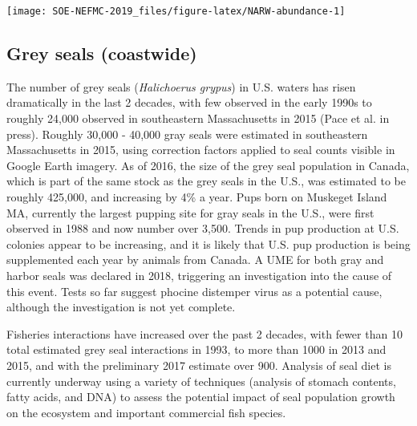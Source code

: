 \documentclass[10pt,]{article}
\let\origfigure\figure
\let\endorigfigure\endfigure
\renewenvironment{figure}[1][2] {
    \expandafter\origfigure\expandafter[H]
} {
    \endorigfigure
}
\begin{document}
\begin{figure}

{\centering \texttt{[image: SOE-NEFMC-2019\_files/figure-latex/NARW-abundance-1]} 

}

\caption{Right whale abundance estimates with 95\% credible intervals. These values represent the estimated number of animals alive sometime during the year referenced and NOT at the end of the year referenced. Seventeen known deaths were recorded in 2017 (likely all from anthropogenic causes), but these deaths were not reflected in the 2017 estimate because those animals were alive sometime during the year.}\label{fig:NARW-abundance}
\end{figure}

\subsection{Grey seals (coastwide)}\label{grey-seals-coastwide}

The number of grey seals (\emph{Halichoerus grypus}) in U.S. waters has
risen dramatically in the last 2 decades, with few observed in the early
1990s to roughly 24,000 observed in southeastern Massachusetts in 2015
(Pace et al. in press). Roughly 30,000 - 40,000 gray seals were
estimated in southeastern Massachusetts in 2015, using correction
factors applied to seal counts visible in Google Earth imagery. As of
2016, the size of the grey seal population in Canada, which is part of
the same stock as the grey seals in the U.S., was estimated to be
roughly 425,000, and increasing by 4\% a year. Pups born on Muskeget
Island MA, currently the largest pupping site for gray seals in the
U.S., were first observed in 1988 and now number over 3,500. Trends in
pup production at U.S. colonies appear to be increasing, and it is
likely that U.S. pup production is being supplemented each year by
animals from Canada. A UME for both gray and harbor seals was declared
in 2018, triggering an investigation into the cause of this event. Tests
so far suggest phocine distemper virus as a potential cause, although
the investigation is not yet complete.

Fisheries interactions have increased over the past 2 decades, with
fewer than 10 total estimated grey seal interactions in 1993, to more
than 1000 in 2013 and 2015, and with the preliminary 2017 estimate over
900. Analysis of seal diet is currently underway using a variety of
techniques (analysis of stomach contents, fatty acids, and DNA) to
assess the potential impact of seal population growth on the ecosystem
and important commercial fish species.
\end{document}
